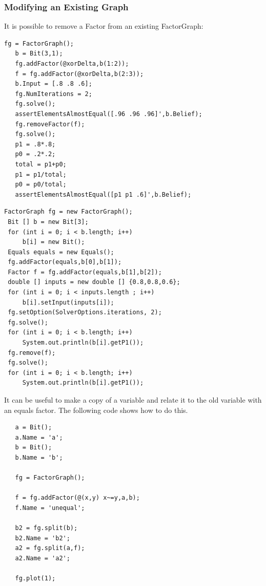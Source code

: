 \subsubsection{Modifying an Existing Graph}


It is possible to remove a Factor from an existing FactorGraph:

\ifmatlab

\begin{lstlisting}
fg = FactorGraph();
   b = Bit(3,1);
   fg.addFactor(@xorDelta,b(1:2));
   f = fg.addFactor(@xorDelta,b(2:3));
   b.Input = [.8 .8 .6];
   fg.NumIterations = 2;
   fg.solve();
   assertElementsAlmostEqual([.96 .96 .96]',b.Belief);
   fg.removeFactor(f);
   fg.solve();
   p1 = .8*.8;
   p0 = .2*.2;
   total = p1+p0;
   p1 = p1/total;
   p0 = p0/total;
   assertElementsAlmostEqual([p1 p1 .6]',b.Belief);
\end{lstlisting}

\fi

\ifjava

\begin{lstlisting}
FactorGraph fg = new FactorGraph();
 Bit [] b = new Bit[3];
 for (int i = 0; i < b.length; i++)
	 b[i] = new Bit();
 Equals equals = new Equals();
 fg.addFactor(equals,b[0],b[1]);
 Factor f = fg.addFactor(equals,b[1],b[2]);
 double [] inputs = new double [] {0.8,0.8,0.6};
 for (int i = 0; i < inputs.length ; i++)
	 b[i].setInput(inputs[i]);
 fg.setOption(SolverOptions.iterations, 2);
 fg.solve();
 for (int i = 0; i < b.length; i++)
	 System.out.println(b[i].getP1());
 fg.remove(f);
 fg.solve();
 for (int i = 0; i < b.length; i++)
	 System.out.println(b[i].getP1());
\end{lstlisting}
\fi


It can be useful to make a copy of a variable and relate it to the old variable with an equals factor. The following code shows how to do this.

\ifmatlab

\begin{lstlisting}
   a = Bit();
   a.Name = 'a';
   b = Bit();
   b.Name = 'b';
  
   fg = FactorGraph();
  
   f = fg.addFactor(@(x,y) x~=y,a,b);
   f.Name = 'unequal';
   
   b2 = fg.split(b);
   b2.Name = 'b2';
   a2 = fg.split(a,f);
   a2.Name = 'a2';
   
   fg.plot(1);
\end{lstlisting}

